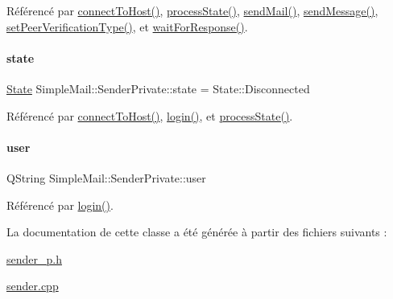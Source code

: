 Référencé par \hyperlink{class_simple_mail_1_1_sender_private_aa2f9a37cfe58c3e39afa75e79070cee1}{connect\+To\+Host()}, \hyperlink{class_simple_mail_1_1_sender_private_ab3a7663dd6945ce2ba074d37cfc4e4ec}{process\+State()}, \hyperlink{class_simple_mail_1_1_sender_private_a2ede5284746e77ee37b8fe96f4bbb100}{send\+Mail()}, \hyperlink{class_simple_mail_1_1_sender_private_a01805bb24291bf6cad3a656a16d0bb25}{send\+Message()}, \hyperlink{class_simple_mail_1_1_sender_private_aea040b22ce411e03111080e7546f91c0}{set\+Peer\+Verification\+Type()}, et \hyperlink{class_simple_mail_1_1_sender_private_af8ba23dc3e1201d303ad1d923235c71c}{wait\+For\+Response()}.

\mbox{\label{class_simple_mail_1_1_sender_private_af73e80fdae8024d12714f6f3a1cc1e23}} 
\paragraph{\texorpdfstring{state}{state}}
{\footnotesize\ttfamily \hyperlink{class_simple_mail_1_1_sender_private_ae09befddf0fae8e8f2ea153ead2b8b0a}{State} Simple\+Mail\+::\+Sender\+Private\+::state = State\+::\+Disconnected}



Référencé par \hyperlink{class_simple_mail_1_1_sender_private_aa2f9a37cfe58c3e39afa75e79070cee1}{connect\+To\+Host()}, \hyperlink{class_simple_mail_1_1_sender_private_a927e5c262ee89fb335410ebec020091d}{login()}, et \hyperlink{class_simple_mail_1_1_sender_private_ab3a7663dd6945ce2ba074d37cfc4e4ec}{process\+State()}.

\mbox{\label{class_simple_mail_1_1_sender_private_ac3efab988a41e60a0a56c29a1d5b04ed}} 
\paragraph{\texorpdfstring{user}{user}}
{\footnotesize\ttfamily Q\+String Simple\+Mail\+::\+Sender\+Private\+::user}



Référencé par \hyperlink{class_simple_mail_1_1_sender_private_a927e5c262ee89fb335410ebec020091d}{login()}.



La documentation de cette classe a été générée à partir des fichiers suivants \+:\begin{DoxyCompactItemize}
\item 
\hyperlink{sender__p_8h}{sender\+\_\+p.\+h}\item 
\hyperlink{sender_8cpp}{sender.\+cpp}\end{DoxyCompactItemize}
